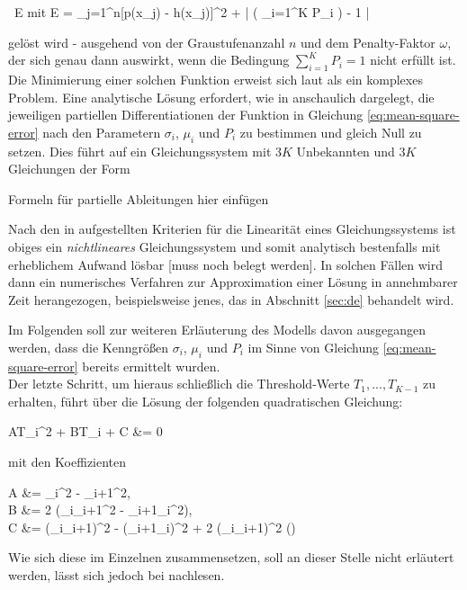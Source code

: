 		\begin{flalign}
			\centering
			 \ E \quad \textrm{mit } E =  \sum_{j=1}^{n}[p(x_{j}) - h(x_{j})]^{2} + \omega \cdot \left| \left( \sum_{i=1}^{K} P_{i} \right) - 1 \right| \label{eq:mean-square-error}
		\end{flalign}
		gelöst wird - ausgehend von der Graustufenanzahl $n$ und dem Penalty-Faktor $\omega$, der sich genau dann auswirkt, wenn die Bedingung $\sum_{i=1}^{K} P_{i} = 1$ nicht erfüllt ist.\\
		Die Minimierung einer solchen Funktion erweist sich laut \cite{cuevas-meth1} als ein komplexes Problem. Eine analytische Lösung erfordert, wie in \cite[S. 248-250]{papula-optimization} anschaulich dargelegt, die jeweiligen partiellen Differentiationen der Funktion in Gleichung \ref{eq:mean-square-error} nach den Parametern $\sigma_{i}$, $\mu_{i}$ und $P_{i}$ zu bestimmen und gleich Null zu setzen. Dies führt auf ein Gleichungssystem mit $3K$ Unbekannten und $3K$ Gleichungen der Form
		\begin{flalign*}
			\textrm{\color{red} Formeln für partielle Ableitungen hier einfügen}
		\end{flalign*}
		Nach den in \cite[S. 26]{papula-alg-eq} aufgestellten Kriterien für die Linearität eines Gleichungssystems ist obiges ein \textit{nichtlineares} Gleichungssystem und somit analytisch bestenfalls mit erheblichem Aufwand lösbar \color{red}[muss noch belegt werden]\color{black}. In solchen Fällen wird dann ein numerisches Verfahren zur Approximation einer Lösung in annehmbarer Zeit herangezogen, beispielsweise jenes, das in Abschnitt \ref{sec:de} behandelt wird. 
		
		Im Folgenden soll zur weiteren Erläuterung des Modells davon ausgegangen werden, dass die Kenngrößen $\sigma_{i}$, $\mu_{i}$ und $P_{i}$ im Sinne von Gleichung \ref{eq:mean-square-error} bereits ermittelt wurden. \\
		Der letzte Schritt, um hieraus schließlich die Threshold-Werte $T_{1}, ... , T_{K-1}$ zu erhalten, führt über die Lösung der folgenden quadratischen Gleichung:
		\begin{flalign}
			AT_{i^{2}} + BT_{i} + C &= 0 \label{eq:quad-eq-thresh}
		\end{flalign}
		mit den Koeffizienten
		\begin{flalign}
			A &= \sigma_{i}^{2} - \sigma_{i+1}^{2}, \notag \\
			B &= 2 \cdot (\mu_{i}\sigma_{i+1}^{2} - \mu_{i+1}\sigma_{i}^{2}), \notag \\
			C &= (\sigma_{i}\mu_{i+1})^{2} - (\sigma_{i+1}\mu_{i})^{2} + 2 \cdot (\sigma_{i}\sigma_{i+1})^{2} \cdot \ln \left(\right) \notag
		\end{flalign}
		Wie sich diese im Einzelnen zusammensetzen, soll an dieser Stelle nicht erläutert werden, lässt sich jedoch bei \cite[S. 13+14]{cuevas-meth1} nachlesen.
		
